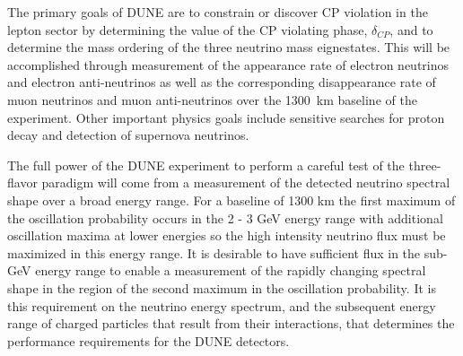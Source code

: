 \label{detbeamtest}

The primary goals of DUNE are to 
constrain or discover CP violation in the lepton sector by determining 
the value of the
CP violating phase, $\delta_{CP}$, and
to determine the mass ordering of the three neutrino mass eignestates. 
This will be accomplished through measurement of 
the appearance rate of electron neutrinos and electron anti-neutrinos 
as well as the corresponding disappearance rate of muon neutrinos 
and muon anti-neutrinos over the 1300~km baseline of the experiment. 
Other important physics goals include sensitive searches for proton decay and detection of supernova neutrinos.

The full power of the DUNE experiment to perform a careful test of the three-flavor paradigm will come from a measurement of the detected neutrino spectral shape over a broad energy range.  For a baseline of 1300 km the first maximum of the oscillation probability occurs in the 2 - 3 GeV energy range with additional oscillation maxima at lower energies so the high intensity neutrino flux must be maximized in this energy range. It is desirable to have sufficient flux in the sub-GeV energy range to enable a measurement of the rapidly changing spectral shape in the region of the second maximum in the oscillation probability. It is this requirement on the neutrino energy spectrum, and the subsequent energy range of charged particles that result from their interactions, that determines the performance requirements for the DUNE detectors. 


